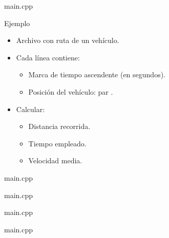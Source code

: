  {
\begin{frame}[t]
\begin{block}{main.cpp}

\end{block}
\end{frame}
}

\begin{frame}[t]{Ejemplo}
\begin{itemize}
  \item Archivo con ruta de un vehículo.

  \item Cada línea contiene:
     \begin{itemize}
       \item Marca de tiempo ascendente (en segundos).
       \item Posición del vehículo: par .
     \end{itemize}

  \item Calcular:
    \begin{itemize}
      \item Distancia recorrida.
      \item Tiempo empleado.
      \item Velocidad media.
    \end{itemize}
\end{itemize}
\end{frame}

 {

\begin{frame}[t]
\begin{block}{main.cpp}

\end{block}
\end{frame}

\begin{frame}[t]
\begin{block}{main.cpp}

\end{block}
\end{frame}

\begin{frame}[t]
\begin{block}{main.cpp}

\end{block}
\end{frame}

}

 {
\begin{frame}[t]
\begin{block}{main.cpp}

\end{block}
\end{frame}
}
